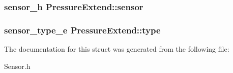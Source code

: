 \subsubsection[{sensor}]{\setlength{\rightskip}{0pt plus 5cm}sensor\-\_\-h Pressure\-Extend\-::sensor}\label{structPressureExtend_a6183313f63fc129e7e60b13226b1cba5}
\subsubsection[{type}]{\setlength{\rightskip}{0pt plus 5cm}sensor\-\_\-type\-\_\-e Pressure\-Extend\-::type}\label{structPressureExtend_a0b12e9ee1e99b1ddf173d3eeec4483a2}


The documentation for this struct was generated from the following file\-:\begin{DoxyCompactItemize}
\item 
Sensor.\-h\end{DoxyCompactItemize}
